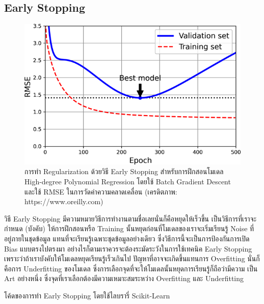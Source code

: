 \subsection{Early Stopping}
\label{ssec:early_stop}

\begin{figure}[H]
    \centering
    \includegraphics[width=0.9\linewidth]{fig/early_stopping.png}
    \caption{การทำ Regularization ด้วยวิธี Early Stopping สำหรับการฝึกสอนโมเดล High-degree Polynomial Regression 
    โดยใช้ Batch Gradient Descent และใช้ RMSE ในการวัดค่าความคลาดเคลื่อน (เครดิตภาพ: https://www.oreilly.com)}
    \label{fig:early_stopping}
\end{figure}

วิธี Early Stopping มีความหมายวิธีการทำงานตามชื่อเลยนั่นก็คือหยุดให้เร็วขึ้น เป็นวิธีการที่เราจะกำหนด (บังคับ) ให้การฝึกสอนหรือ Training 
นั้นหยุดก่อนที่โมเดลของเราจะเริ่มเรียนรู้ Noise ที่อยู่ภายในชุดข้อมูล แทนที่จะเรียนรู้เฉพาะชุดข้อมูลอย่างเดียว ซึ่งวิธีการนี้จะเป็นการป้องกันการเปิด 
Bias แบบตรงไปตรงมา อย่างไรก็ตามเราควรจะต้องระมัดระวังในการใช้เทคนิค Early Stopping เพราะว่าถ้าเราบังคับให้โมเดลหยุดเรียนรู้เร็วเกินไป
ปัญหาที่อาจจะเกิดขึ้นแทนการ Overfitting นั่นก็คือการ Underfitting ของโมเดล ซึ่งการเลือกจุดที่จะให้โมเดลนั้นหยุดการเรียนรู้ก็ถือว่ามีความ%
เป็น Art อย่างหนึ่ง ซึ่งจุดที่เราเลือกต้องมีความเหมาะสมระหว่าง Overfitting และ Underfitting

\noindent โค้ดของการทำ Early Stopping โดยใช้ไลบรารี่ Scikit-Learn

